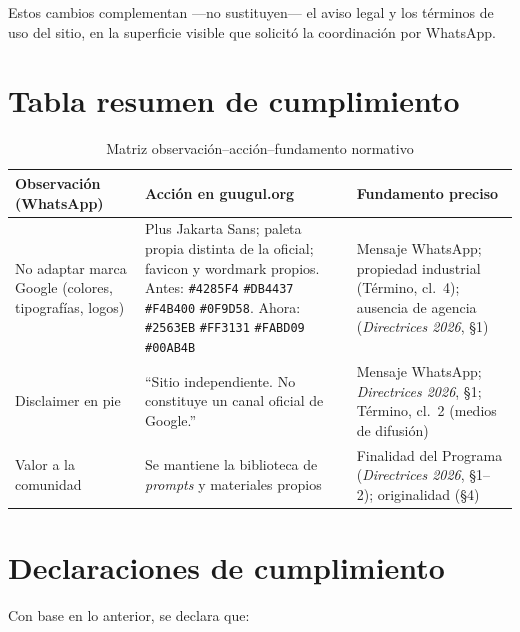 \documentclass[11pt,a4paper]{article}
\begin{document}
Estos cambios complementan ---no sustituyen--- el aviso legal y los términos de uso del sitio, en la superficie visible que solicitó la coordinación por WhatsApp.

\section{Tabla resumen de cumplimiento}

\begin{table}[h]
\centering
\caption{Matriz observación--acción--fundamento normativo}
\begin{tabular}{@{}p{3.2cm}p{4.6cm}p{5.8cm}@{}}
\toprule
\textbf{Observación (WhatsApp)} & \textbf{Acción en guugul.org} & \textbf{Fundamento preciso} \\
\midrule
No adaptar marca Google (colores, tipografías, logos) & Plus Jakarta Sans; paleta propia distinta de la oficial; favicon y wordmark propios. Antes: \texttt{\#4285F4} \texttt{\#DB4437} \texttt{\#F4B400} \texttt{\#0F9D58}. Ahora: \texttt{\#2563EB} \texttt{\#FF3131} \texttt{\#FABD09} \texttt{\#00AB4B} & Mensaje WhatsApp; propiedad industrial (Término, cl.~4); ausencia de agencia (\emph{Directrices 2026}, §1) \\
\addlinespace
Disclaimer en pie & \enquote{Sitio independiente. No constituye un canal oficial de Google.} & Mensaje WhatsApp; \emph{Directrices 2026}, §1; Término, cl.~2 (medios de difusión) \\
\addlinespace
Valor a la comunidad & Se mantiene la biblioteca de \emph{prompts} y materiales propios & Finalidad del Programa (\emph{Directrices 2026}, §1--2); originalidad (§4) \\
\bottomrule
\end{tabular}
\end{table}

\section{Declaraciones de cumplimiento}

Con base en lo anterior, se declara que:
\end{document}
